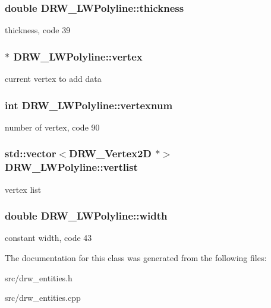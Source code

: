 \subsubsection[{thickness}]{\setlength{\rightskip}{0pt plus 5cm}double D\+R\+W\+\_\+\+L\+W\+Polyline\+::thickness}\label{class_d_r_w___l_w_polyline_abab38cc3e874a5c89469b382ebeb2284}
thickness, code 39 \hypertarget{class_d_r_w___l_w_polyline_af59a2babb12d2f8865991c39cf464538}{}
\subsubsection[{vertex}]{$\ast$ D\+R\+W\+\_\+\+L\+W\+Polyline\+::vertex}\label{class_d_r_w___l_w_polyline_af59a2babb12d2f8865991c39cf464538}
current vertex to add data \hypertarget{class_d_r_w___l_w_polyline_a7aa318239f9956b6e0331199491e20a5}{}
\subsubsection[{vertexnum}]{\setlength{\rightskip}{0pt plus 5cm}int D\+R\+W\+\_\+\+L\+W\+Polyline\+::vertexnum}\label{class_d_r_w___l_w_polyline_a7aa318239f9956b6e0331199491e20a5}
number of vertex, code 90 \hypertarget{class_d_r_w___l_w_polyline_a2da7f3449eec6588fb3765a1c9541404}{}
\subsubsection[{vertlist}]{\setlength{\rightskip}{0pt plus 5cm}std\+::vector$<${\bf D\+R\+W\+\_\+\+Vertex2\+D} $\ast$$>$ D\+R\+W\+\_\+\+L\+W\+Polyline\+::vertlist}\label{class_d_r_w___l_w_polyline_a2da7f3449eec6588fb3765a1c9541404}
vertex list \hypertarget{class_d_r_w___l_w_polyline_aedd6dd732a0b425711921104b52f8ce9}{}
\subsubsection[{width}]{\setlength{\rightskip}{0pt plus 5cm}double D\+R\+W\+\_\+\+L\+W\+Polyline\+::width}\label{class_d_r_w___l_w_polyline_aedd6dd732a0b425711921104b52f8ce9}
constant width, code 43 

The documentation for this class was generated from the following files\+:\begin{DoxyCompactItemize}
\item 
src/drw\+\_\+entities.\+h\item 
src/drw\+\_\+entities.\+cpp\end{DoxyCompactItemize}
